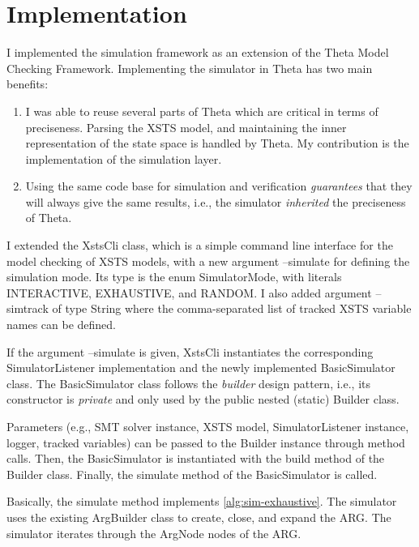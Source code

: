 \section{Implementation}\label{sec:sim-impl}

I implemented the simulation framework as an extension of the Theta Model Checking Framework. Implementing the simulator in Theta has two main benefits:

\begin{enumerate}
    \item I was able to reuse several parts of Theta which are critical in terms of preciseness. Parsing the XSTS model, and maintaining the inner representation of the state space is handled by Theta. My contribution is the implementation of the simulation layer.
    \item Using the same code base for simulation and verification \textit{guarantees} that they will always give the same results, i.e., the simulator \emph{inherited} the preciseness of Theta.
\end{enumerate}

I extended the \textsf{XstsCli} class, which is a simple command line interface for the model checking of XSTS models, with a new argument \textsf{--simulate} for defining the simulation mode. Its type is the enum \textsf{SimulatorMode}, with literals \textsf{INTERACTIVE}, \textsf{EXHAUSTIVE}, and \textsf{RANDOM}. I also added argument \textsf{--simtrack} of type String where the comma-separated list of tracked XSTS variable names can be defined.

If the argument \textsf{--simulate} is given, \textsf{XstsCli} instantiates the corresponding \textsf{SimulatorListener} implementation and the newly implemented \textsf{BasicSimulator} class. The \textsf{BasicSimulator} class follows the \textit{builder} design pattern, i.e., its constructor is \textit{private} and only used by the public nested (static) \textsf{Builder} class.

Parameters (e.g., SMT solver instance, XSTS model, \textsf{SimulatorListener} instance, logger, tracked variables) can be passed to the \textsf{Builder} instance through method calls. Then, the \textsf{BasicSimulator} is instantiated with the \textsf{build} method of the \textsf{Builder} class. Finally, the \textsf{simulate} method of the \textsf{BasicSimulator} is called.

Basically, the \textsf{simulate} method implements \autoref{alg:sim-exhaustive}. The simulator uses the existing \textsf{ArgBuilder} class to \textsf{create}, \textsf{close}, and \textsf{expand} the \textsf{ARG}. The simulator iterates through the \textsf{ArgNode} nodes of the \textsf{ARG}.

